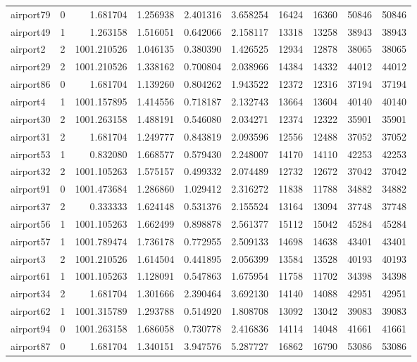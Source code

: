 \begin{longtable}{|l|r|r|r|r|r|r|r|r|r|}
airport79 & 0 & 1.681704 & 1.256938 & 2.401316 & 3.658254 & 16424 & 16360 & 50846 & 50846 \\
airport49 & 1 & 1.263158 & 1.516051 & 0.642066 & 2.158117 & 13318 & 13258 & 38943 & 38943 \\
airport2 & 2 & 1001.210526 & 1.046135 & 0.380390 & 1.426525 & 12934 & 12878 & 38065 & 38065 \\
airport29 & 2 & 1001.210526 & 1.338162 & 0.700804 & 2.038966 & 14384 & 14332 & 44012 & 44012 \\
airport86 & 0 & 1.681704 & 1.139260 & 0.804262 & 1.943522 & 12372 & 12316 & 37194 & 37194 \\
airport4 & 1 & 1001.157895 & 1.414556 & 0.718187 & 2.132743 & 13664 & 13604 & 40140 & 40140 \\
airport30 & 2 & 1001.263158 & 1.488191 & 0.546080 & 2.034271 & 12374 & 12322 & 35901 & 35901 \\
airport31 & 2 & 1.681704 & 1.249777 & 0.843819 & 2.093596 & 12556 & 12488 & 37052 & 37052 \\
airport53 & 1 & 0.832080 & 1.668577 & 0.579430 & 2.248007 & 14170 & 14110 & 42253 & 42253 \\
airport32 & 2 & 1001.105263 & 1.575157 & 0.499332 & 2.074489 & 12732 & 12672 & 37042 & 37042 \\
airport91 & 0 & 1001.473684 & 1.286860 & 1.029412 & 2.316272 & 11838 & 11788 & 34882 & 34882 \\
airport37 & 2 & 0.333333 & 1.624148 & 0.531376 & 2.155524 & 13164 & 13094 & 37748 & 37748 \\
airport56 & 1 & 1001.105263 & 1.662499 & 0.898878 & 2.561377 & 15112 & 15042 & 45284 & 45284 \\
airport57 & 1 & 1001.789474 & 1.736178 & 0.772955 & 2.509133 & 14698 & 14638 & 43401 & 43401 \\
airport3 & 2 & 1001.210526 & 1.614504 & 0.441895 & 2.056399 & 13584 & 13528 & 40193 & 40193 \\
airport61 & 1 & 1001.105263 & 1.128091 & 0.547863 & 1.675954 & 11758 & 11702 & 34398 & 34398 \\
airport34 & 2 & 1.681704 & 1.301666 & 2.390464 & 3.692130 & 14140 & 14088 & 42951 & 42951 \\
airport62 & 1 & 1001.315789 & 1.293788 & 0.514920 & 1.808708 & 13092 & 13042 & 39083 & 39083 \\
airport94 & 0 & 1001.263158 & 1.686058 & 0.730778 & 2.416836 & 14114 & 14048 & 41661 & 41661 \\
airport87 & 0 & 1.681704 & 1.340151 & 3.947576 & 5.287727 & 16862 & 16790 & 53086 & 53086 \\

\end{longtable}
